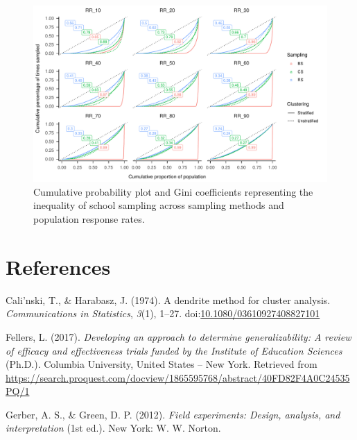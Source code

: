 \documentclass[man,floatsintext]{apa6}
\begin{document}
\begin{figure}
\includegraphics{GenSamp-Paper_files/figure-latex/fig-gini-curve-1} \caption{Cumulative probability plot and Gini coefficients representing the inequality of school sampling across sampling methods and population response rates.}\label{fig:fig-gini-curve}
\end{figure}

\newpage

\hypertarget{references}{%
\section{References}\label{references}}

\begingroup
\setlength{\parindent}{-0.5in}
\setlength{\leftskip}{0.5in}

\hypertarget{refs}{}
\leavevmode\hypertarget{ref-calinskiDendriteMethodCluster1974}{}%
Cali\a'nski, T., \& Harabasz, J. (1974). A dendrite method for cluster analysis. \emph{Communications in Statistics}, \emph{3}(1), 1--27. doi:\href{https://doi.org/10.1080/03610927408827101}{10.1080/03610927408827101}

\leavevmode\hypertarget{ref-fellersDevelopingApproachDetermine2017}{}%
Fellers, L. (2017). \emph{Developing an approach to determine generalizability: A review of efficacy and effectiveness trials funded by the Institute of Education Sciences} (Ph.D.). Columbia University, United States -- New York. Retrieved from \url{https://search.proquest.com/docview/1865595768/abstract/40FD82F4A0C24535PQ/1}

\leavevmode\hypertarget{ref-gerberFieldExperimentsDesign2012}{}%
Gerber, A. S., \& Green, D. P. (2012). \emph{Field experiments: Design, analysis, and interpretation} (1st ed.). New York: W. W. Norton.
\end{document}
